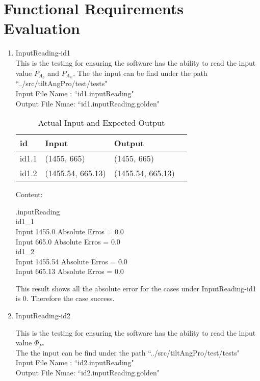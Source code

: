 \documentclass[12pt, titlepage]{article}
\begin{document}
\section{Functional Requirements Evaluation}
\begin{enumerate}
\item{InputReading-id1\\}
This is the testing for ensuring the software has the ability to read the input value $P_{A_{h}}$ and $P_{A_{w}}$.
The the input can be find under the path ``../src/tiltAngPro/test/tests"\\
Input File Name : ``id1.inputReading"\\
Output File Nmae: ``id1.inputReading.golden"



\begin{table}[h!]
\centering
\noindent \begin{tabular}{l l l l} 
    \toprule		
    \textbf{id} & \textbf{Input} & \textbf{Output}\\ 
	\midrule
   id1.1 &  (1455, 665)  & (1455, 665)\\
   id1.2 &  (1455.54, 665.13) & (1455.54, 665.13)\\
    \bottomrule
  \end{tabular}
\caption{Actual Input and Expected Output}
\end{table}


Content:
\begin{center}
.inputReading\\
id1\_1\\
Input 1455.0 Absolute Erros = 0.0\\
Input 665.0 Absolute Erros = 0.0\\
id1\_2\\
Input 1455.54 Absolute Erros = 0.0\\
Input 665.13 Absolute Erros = 0.0\\
\end{center}



This result shows all the absolute error for the cases under InputReading-id1 is 0. Therefore the case success.

\item{InputReading-id2\\}

This is the testing for ensuring the software has the ability to read the input value $\Phi_P$.\\
The the input can be find under the path ``../src/tiltAngPro/test/tests"\\
Input File Name : ``id2.inputReading"\\
Output File Nmae: ``id2.inputReading.golden"


\end{enumerate}
\end{document}
